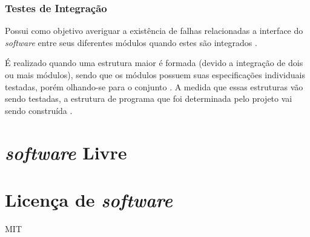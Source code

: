         \subsubsection{Testes de Integração}
        Possui como objetivo averiguar a existência de falhas relacionadas a interface do \textit{software} entre seus diferentes módulos quando estes são integrados \cite{artigo_intro_teste}.

        É realizado quando uma estrutura maior é formada (devido a integração de dois ou mais módulos), sendo que os módulos possuem suas especificações individuais testadas, porém olhando-se para o conjunto \cite{sw_test_tech}. A medida que essas estruturas vão sendo testadas, a estrutura de programa que foi determinada pelo projeto vai sendo construída \cite{maldonado}.

\section{\textit{software} Livre}

\section{Licença de \textit{software}}
MIT